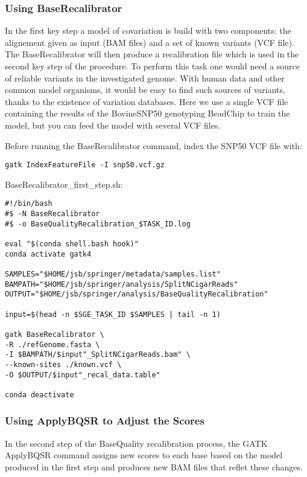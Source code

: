 \subsubsection{Using BaseRecalibrator}

In the first key step  a model of covariation is build with two components: the alignement given as input (BAM files) and a set of known variants (VCF file). The BaseRecalibrator will then produce a recalibration file which is used in the second key step of the procedure. To perform this task one would need a source of reliable variants in the investigated genome. With human data and other common model organisms, it would be easy to find such sources of variants, thanks to the existence of variation databases. Here we use a single VCF file containing the results of the BovineSNP50 genotyping BeadChip to train the model, but you can feed the model with several VCF files.

Before running the BaseRecalibrator command, index the SNP50 VCF file with:

\begin{verbatim}
gatk IndexFeatureFile -I snp50.vcf.gz
\end{verbatim}


\noindent BaseRecalibrator\_first\_step.sh:
\begin{verbatim}
#!/bin/bash
#$ -N BaseRecalibrator
#$ -o BaseQualityRecalibration_$TASK_ID.log

eval "$(conda shell.bash hook)"
conda activate gatk4

SAMPLES="$HOME/jsb/springer/metadata/samples.list"
BAMPATH="$HOME/jsb/springer/analysis/SplitNCigarReads"
OUTPUT="$HOME/jsb/springer/analysis/BaseQualityRecalibration"

input=$(head -n $SGE_TASK_ID $SAMPLES | tail -n 1)

gatk BaseRecalibrator \
-R ./refGenome.fasta \
-I $BAMPATH/$input"_SplitNCigarReads.bam" \
--known-sites ./known.vcf \
-O $OUTPUT/$input"_recal_data.table"

conda deactivate
\end{verbatim}





\subsubsection{Using ApplyBQSR to Adjust the Scores}

In the second step of the BaseQuality recalibration process, the GATK ApplyBQSR command assigns new scores to each base based on the model produced in the first step and produces new BAM files that reflet these changes.  


